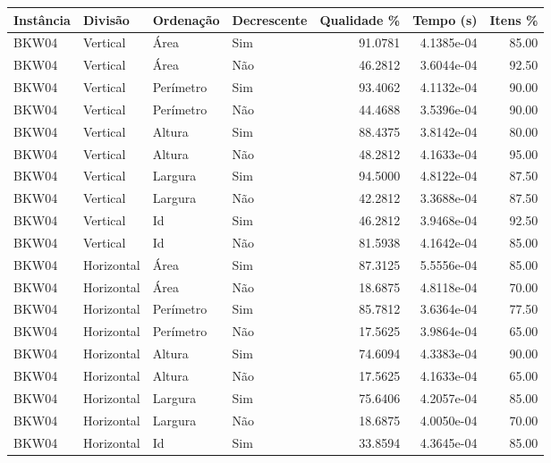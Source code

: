 \begin{tabular}{llllrrr}
\hline
Instância & Divisão     & Ordenação & Decrescente & Qualidade \% & Tempo (s)  & Itens \% \\
\hline
BKW04     & Vertical    & Área      & Sim         & 91.0781      & 4.1385e-04 & 85.00    \\
BKW04     & Vertical    & Área      & Não         & 46.2812      & 3.6044e-04 & 92.50    \\
BKW04     & Vertical    & Perímetro & Sim         & 93.4062      & 4.1132e-04 & 90.00    \\
BKW04     & Vertical    & Perímetro & Não         & 44.4688      & 3.5396e-04 & 90.00    \\
BKW04     & Vertical    & Altura    & Sim         & 88.4375      & 3.8142e-04 & 80.00    \\
BKW04     & Vertical    & Altura    & Não         & 48.2812      & 4.1633e-04 & 95.00    \\
BKW04     & Vertical    & Largura   & Sim         & 94.5000      & 4.8122e-04 & 87.50    \\
BKW04     & Vertical    & Largura   & Não         & 42.2812      & 3.3688e-04 & 87.50    \\
BKW04     & Vertical    & Id        & Sim         & 46.2812      & 3.9468e-04 & 92.50    \\
BKW04     & Vertical    & Id        & Não         & 81.5938      & 4.1642e-04 & 85.00    \\
BKW04     & Horizontal  & Área      & Sim         & 87.3125      & 5.5556e-04 & 85.00    \\
BKW04     & Horizontal  & Área      & Não         & 18.6875      & 4.8118e-04 & 70.00    \\
BKW04     & Horizontal  & Perímetro & Sim         & 85.7812      & 3.6364e-04 & 77.50    \\
BKW04     & Horizontal  & Perímetro & Não         & 17.5625      & 3.9864e-04 & 65.00    \\
BKW04     & Horizontal  & Altura    & Sim         & 74.6094      & 4.3383e-04 & 90.00    \\
BKW04     & Horizontal  & Altura    & Não         & 17.5625      & 4.1633e-04 & 65.00    \\
BKW04     & Horizontal  & Largura   & Sim         & 75.6406      & 4.2057e-04 & 85.00    \\
BKW04     & Horizontal  & Largura   & Não         & 18.6875      & 4.0050e-04 & 70.00    \\
BKW04     & Horizontal  & Id        & Sim         & 33.8594      & 4.3645e-04 & 85.00    \\

\end{tabular}
